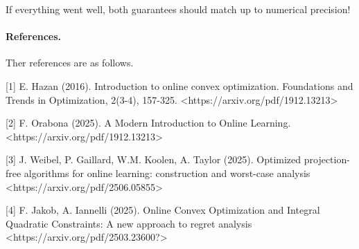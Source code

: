\documentclass{article}
\begin{document}
If everything went well, both guarantees should match up to numerical precision!
\paragraph{References.}

Ther references are as follows.

[1] E. Hazan (2016).
Introduction to online convex optimization.
Foundations and Trends in Optimization, 2(3-4), 157-325.
<https://arxiv.org/pdf/1912.13213>

[2] F. Orabona (2025).
A Modern Introduction to Online Learning.
<https://arxiv.org/pdf/1912.13213>

[3] J. Weibel, P. Gaillard, W.M. Koolen, A. Taylor (2025).
Optimized projection-free algorithms for online learning: construction and worst-case analysis
<https://arxiv.org/pdf/2506.05855>

[4] F. Jakob, A. Iannelli (2025).
Online Convex Optimization and Integral Quadratic Constraints: A new approach to regret analysis
<https://arxiv.org/pdf/2503.23600?>
\end{document}
